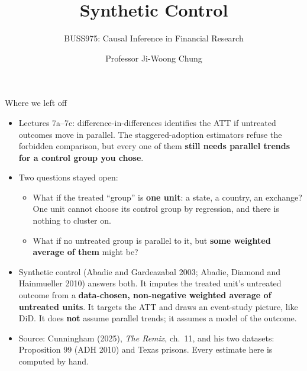 \documentclass[
  11pt,
  ignorenonframetext,
  aspectratio=169,
]{beamer}
\title{\texorpdfstring{Synthetic Control}{Synthetic Control}}
\subtitle{\texorpdfstring{BUSS975: Causal Inference in Financial
Research}{BUSS975: Causal Inference in Financial Research}}
\author{Professor Ji-Woong Chung}
\date{}
\institute{Korea University}
\providecommand{\tightlist}{%
  \setlength{\itemsep}{0pt}\setlength{\parskip}{0pt}}
\begin{document}
\frame{\titlepage}


\begin{frame}{Where we left off}
\protect{}\label{where-we-left-off}
\begin{itemize}
\tightlist
\item
  Lectures 7a--7c: difference-in-differences identifies the ATT if
  untreated outcomes move in parallel. The staggered-adoption estimators
  refuse the forbidden comparison, but every one of them \textbf{still
  needs parallel trends for a control group you chose}.
\item
  Two questions stayed open:

  \begin{itemize}
  \tightlist
  \item
    What if the treated ``group'' is \textbf{one unit}: a state, a
    country, an exchange? One unit cannot choose its control group by
    regression, and there is nothing to cluster on.
  \item
    What if no untreated group is parallel to it, but \textbf{some
    weighted average of them} might be?
  \end{itemize}
\end{itemize}

\vspace{0.4em}

\begin{itemize}
\tightlist
\item
  Synthetic control (Abadie and Gardeazabal 2003; Abadie, Diamond and
  Hainmueller 2010) answers both. It imputes the treated unit's
  untreated outcome from a \textbf{data-chosen, non-negative weighted
  average of untreated units}. It targets the ATT and draws an
  event-study picture, like DiD. It does \textbf{not} assume parallel
  trends; it assumes a model of the outcome.
\item
  Source: Cunningham (2025), \emph{The Remix}, ch.~11, and his two
  datasets: Proposition 99 (ADH 2010) and Texas prisons. Every estimate
  here is computed by hand.
\end{itemize}
\end{frame}
\end{document}
